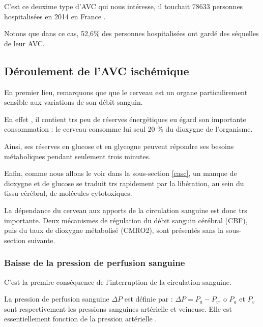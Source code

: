 C'est ce deuxime type d'AVC qui nous int\'eresse, il touchait 78633 personnes hospitalis\'ees en 2014 en France \cite{epi_hem16}.

\par
Notons que dans ce cas, 52,6\% des personnes hospitalis\'ees ont gard\'e des s\'equelles de leur AVC.


\subsection{D\'eroulement de l'AVC isch\'emique}

En premier lieu, remarquons que  que le cerveau est un organe particulirement sensible aux variations de son d\'ebit sanguin.

\par
En effet \cite{pat_neu}, il contient trs peu de r\'eserves \'energ\'etiques eu \'egard son importante consommation : %
le cerveau consomme  lui seul 20 \% du dioxygne de l'organisme.

\par
Ainsi, ses r\'eserves en glucose et en glycogne peuvent r\'epondre  ses besoins m\'etaboliques pendant seulement trois minutes.

\par
Enfin, comme nous allons le voir dans la sous-section \ref{casc}, un manque de dioxygne et de glucose se traduit trs rapidement par la lib\'eration, %
au sein du tissu c\'er\'ebral, de mol\'ecules cytotoxiques.

\etoile
La d\'ependance du cerveau aux apports de la circulation sanguine est donc trs importante. %
Deux m\'ecanismes de r\'egulation du d\'ebit sanguin c\'er\'ebral (CBF), puis du taux de dioxygne m\'etabolis\'e (CMRO2), sont pr\'esent\'es sans la sous-section suivante.

\subsubsection{Baisse de la pression de perfusion sanguine}

C'est la premire cons\'equence de l'interruption de la circulation sanguine.

\par
La pression de perfusion sanguine $\Delta P$ est d\'efinie par : $\Delta P = P_a - P_v$, o $P_a$ et $P_v$ sont respectivement les pressions sanguines art\'erielle et veineuse. %
Elle est essentiellement fonction de la pression art\'erielle \cite{vib_dsc}.

